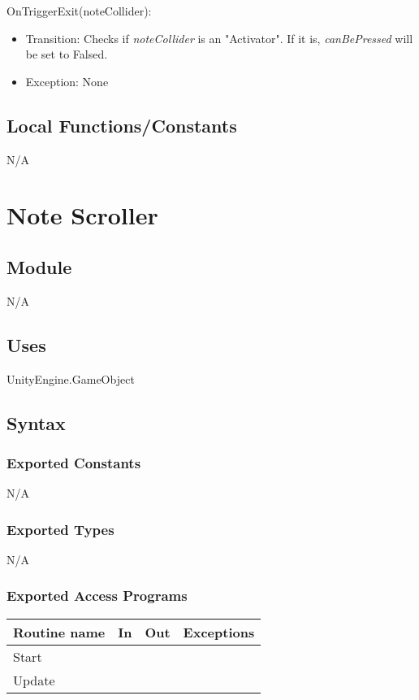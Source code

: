 \documentclass[12pt]{article}
\begin{document}
\noindent OnTriggerExit(noteCollider):
\begin{itemize}
    \item Transition: Checks if \textit{noteCollider} is an "Activator". If it is, \textit{canBePressed} will be set to Falsed.
    \item Exception: None
\end{itemize}

\subsection{Local Functions/Constants}
N/A
\medskip


\newpage

\section{Note Scroller}

\subsection{Module}
N/A

\subsection {Uses}
UnityEngine.GameObject

\subsection {Syntax}

\subsubsection {Exported Constants}
N/A
\subsubsection {Exported Types}
N/A

\subsubsection {Exported Access Programs}

\begin{tabular}{| l | l | l | l |}
\hline
\textbf{Routine name} & \textbf{In} & \textbf{Out} & \textbf{Exceptions}\\
\hline
Start & & & \\
\hline
Update & & & \\
\hline
\end{tabular}
\end{document}
